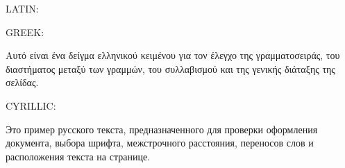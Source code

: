 \documentclass[crop=false,preview=false]{standalone}
\begin{document}
\noindent
\begin{minipage}[c][\textheight][c]{\textwidth}
\centering
\begin{minipage}{10cm}
\setlength{\parindent}{2em}

\noindent
{\regular \scriptsize LATIN:}

{\regular \lipsum[1][1-4]}

\vspace{.5cm}

\noindent
{\regular \scriptsize GREEK:}

{\regular Αυτό είναι ένα δείγμα ελληνικού κειμένου για τον έλεγχο της γραμματοσειράς, του διαστήματος μεταξύ των γραμμών, του συλλαβισμού και της γενικής διάταξης της σελίδας.}
\vspace{.5cm}

\noindent
{\regular \scriptsize CYRILLIC:}

{\regular Это пример русского текста, предназначенного для проверки оформления документа, выбора шрифта, межстрочного расстояния, переносов слов и расположения текста на странице.}
\end{minipage}
\end{minipage}
\end{document}
